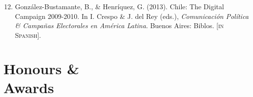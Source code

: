 \documentclass[letterpaper,margin]{res}
\newenvironment{benumerate}[1]{
    \let\oldItem\item
    \def\item{\addtocounter{enumi}{-2}\oldItem}
    \begin{enumerate}
    \setcounter{enumi}{#1}
    \addtocounter{enumi}{1}
}{
    \end{enumerate}
}
\begin{document}
\begin{resume}
\begin{benumerate}{11}

\item{\small Gonz\'alez-Bustamante, B., \& Henr\'iquez, G. (2013). Chile: The Digital Campaign 2009-2010. In I. Crespo \& J. del Rey (eds.), {\itshape Comunicaci\'on Pol\'itica \& Campa\~nas Electorales en Am\'erica Latina}. Buenos Aires: Biblos. {\footnotesize \scshape [in Spanish].}}
\end{benumerate}


\section{\footnotesize Honours \& \\ Awards} 


\end{resume}
\end{document}
